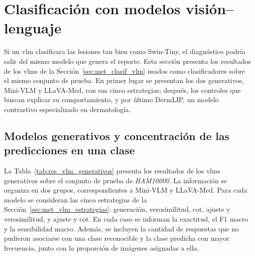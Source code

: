 \section{Clasificación con modelos visión--lenguaje}
\label{sec:res_vlm}

Si un \gls{vlm} clasificara las lesiones tan bien como Swin-Tiny, el diagnóstico podría salir del mismo modelo que
genera el reporte. Esta sección presenta los resultados de los \glspl{vlm} de la Sección~\ref{sec:met_clasif_vlm}
usados como clasificadores sobre el mismo conjunto de prueba. En primer lugar se presentan los dos generativos, Mini-VLM y
LLaVA-Med, con sus cinco estrategias; después, los controles que buscan explicar su comportamiento, y por último
DermLIP, un modelo contrastivo especializado en dermatología.

\subsection{Modelos generativos y concentración de las predicciones en una clase}
\label{sec:res_vlm_generativos}

La Tabla~\ref{tab:res_vlm_generativos} presenta los resultados de los \glspl{vlm} generativos sobre el conjunto de prueba de
\emph{HAM10000}. La información se organiza en dos grupos, correspondientes a Mini-VLM y LLaVA-Med. Para cada modelo se
consideran las cinco estrategias de la Sección~\ref{sec:met_vlm_estrategias}: generación, verosimilitud, \gls{cot}, ajuste
y verosimilitud, y ajuste y \gls{cot}. En cada caso se informan la exactitud, el F1 macro y la sensibilidad macro.
Además, se incluyen la cantidad de respuestas que no pudieron asociarse con una clase reconocible y la clase predicha con
mayor frecuencia, junto con la proporción de imágenes asignadas a ella.

